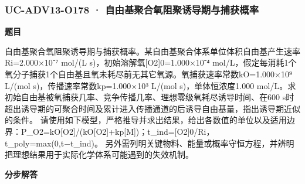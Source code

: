 \documentclass[UTF8,11pt,a4paper]{ctexart}
\begin{document}
\subsubsection*{UC-ADV13-O178 · 自由基聚合氧阻聚诱导期与捕获概率}
\noindent\textbf{题目}\par
自由基聚合氧阻聚诱导期与捕获概率。某自由基聚合体系单位体积自由基产生速率Ri=2.000×10⁻⁷ mol/(L s)，初始溶解氧[O2]0=1.000×10⁻⁴ mol/L，假定每消耗1个氧分子捕获1个自由基且氧未耗尽前无其它氧源。氧捕获速率常数kO=1.000×10⁹ L/(mol s)，传播速率常数kp=1.000×10³ L/(mol s)，单体恒浓度1.000 mol/L。求初始自由基被氧捕获几率、竞争传播几率、理想零级氧耗尽诱导时间、在600 s时超出诱导期的可聚合时间及累计进入传播通道的后诱导自由基量，指出诱导期近似的条件。 请使用如下模型，严格推导并求出结果，给出各数值的单位以及适用边界：P\_O2=kO[O2]/(kO[O2]+kp[M])；t\_ind=[O2]0/Ri，t\_poly=max(0,t−t\_ind)。 另外需列明关键物料、能量或概率守恒方程，并辨明把理想结果用于实际化学体系可能遇到的失效机制。\par
\medskip\noindent\textbf{分步解答}
\end{document}
